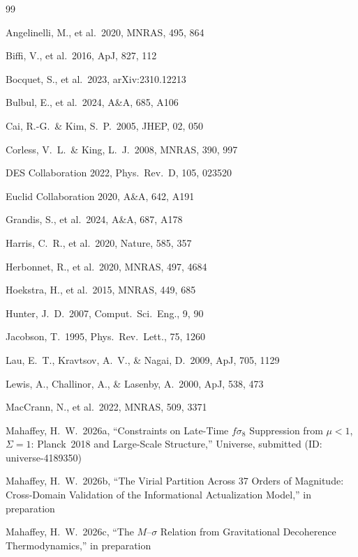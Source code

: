 \documentclass[12pt,a4paper]{article}
\begin{document}
\begin{thebibliography}{99}

 Angelinelli, M., et al.\ 2020, MNRAS, 495, 864

 Biffi, V., et al.\ 2016, ApJ, 827, 112

 Bocquet, S., et al.\ 2023, arXiv:2310.12213

 Bulbul, E., et al.\ 2024, A\&A, 685, A106

 Cai, R.-G.\ \& Kim, S.\ P.\ 2005, JHEP, 02, 050

 Corless, V.\ L.\ \& King, L.\ J.\ 2008, MNRAS, 390, 997

 DES Collaboration 2022, Phys.\ Rev.\ D, 105, 023520

 Euclid Collaboration 2020, A\&A, 642, A191

 Grandis, S., et al.\ 2024, A\&A, 687, A178

 Harris, C.\ R., et al.\ 2020, Nature, 585, 357

 Herbonnet, R., et al.\ 2020, MNRAS, 497, 4684

 Hoekstra, H., et al.\ 2015, MNRAS, 449, 685

 Hunter, J.\ D.\ 2007, Comput.\ Sci.\ Eng., 9, 90

 Jacobson, T.\ 1995, Phys.\ Rev.\ Lett., 75, 1260

 Lau, E.\ T., Kravtsov, A.\ V., \& Nagai, D.\ 2009, ApJ, 705, 1129

 Lewis, A., Challinor, A., \& Lasenby, A.\ 2000, ApJ, 538, 473

 MacCrann, N., et al.\ 2022, MNRAS, 509, 3371

 Mahaffey, H.\ W.\ 2026a, ``Constraints on Late-Time $f\sigma_8$
Suppression from $\mu < 1$, $\Sigma = 1$: Planck~2018 and Large-Scale Structure,''
Universe, submitted (ID: universe-4189350)

 Mahaffey, H.\ W.\ 2026b, ``The Virial Partition Across 37 Orders
of Magnitude: Cross-Domain Validation of the Informational Actualization Model,''
in preparation

 Mahaffey, H.\ W.\ 2026c, ``The $M$--$\sigma$ Relation from
Gravitational Decoherence Thermodynamics,'' in preparation


\end{thebibliography}
\end{document}
